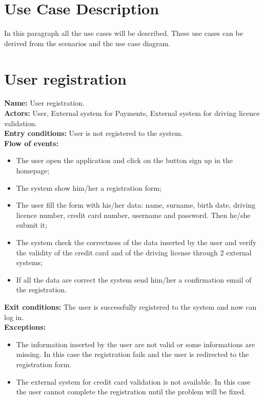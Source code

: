 \section{Use Case Description}
In this paragraph all the use cases will be described. These use cases can be derived from the scenarios and the use case diagram.

\section*{User registration}
\textbf{Name:} User registration. \\
\textbf{Actors:} User, External system for Payments, External system for driving licence validation.\\
\textbf{Entry conditions:} User is not registered to the system.\\
\textbf{Flow of events:}
\begin{itemize}
\item The user open the application and click on the button sign up in the homepage;
\item The system show him/her a registration form;
\item The user fill the form with his/her data: name, surname, birth date, driving licence number, credit card number, username and password. Then he/she submit it;
\item The system check the correctness of the data inserted by the user and verify the validity of the credit card and of the driving license through 2 external systems;
\item If all the data are correct the system send him/her a confirmation email of the registration.
\end{itemize}
\textbf{Exit conditions:} The user is successfully registered to the system and now can log in.\\
\textbf{Exceptions:}
\begin{itemize}
\item The information inserted by the user are not valid or some informations are missing.
In this case the registration fails and the user is redirected to the registration form.
\item The external system for credit card validation is not available. In this case the user cannot complete the registration until the problem will be fixed.
\end{itemize}


